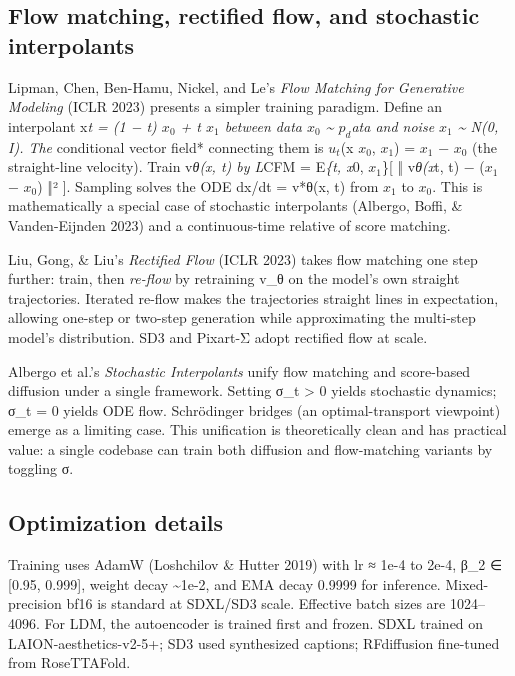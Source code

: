 \subsection{Flow matching, rectified flow, and stochastic interpolants}\label{flow-matching-rectified-flow-and-stochastic-interpolants}

Lipman, Chen, Ben-Hamu, Nickel, and Le's \emph{Flow Matching for Generative Modeling} (ICLR 2023) presents a simpler training paradigm. Define an interpolant x\emph{t = (1 − t) \(x_0\) + t \(x_1\) between data \(x_0\) \textasciitilde{} \(p_d\)ata and noise \(x_1\) \textasciitilde{} N(0, I). The }conditional vector field* connecting them is \(u_t\)(x \textbar{} \(x_0\), \(x_1\)) = \(x_1\) − \(x_0\) (the straight-line velocity). Train v\emph{θ(x, t) by L}CFM = E\emph{\{t, x}0, \(x_1\)\}{[} ‖ v\emph{θ(x}t, t) − (\(x_1\) − \(x_0\)) ‖² {]}. Sampling solves the ODE dx/dt = v*θ(x, t) from \(x_1\) to \(x_0\). This is mathematically a special case of stochastic interpolants (Albergo, Boffi, \& Vanden-Eijnden 2023) and a continuous-time relative of score matching.

Liu, Gong, \& Liu's \emph{Rectified Flow} (ICLR 2023) takes flow matching one step further: train, then \emph{re-flow} by retraining v\_θ on the model's own straight trajectories. Iterated re-flow makes the trajectories straight lines in expectation, allowing one-step or two-step generation while approximating the multi-step model's distribution. SD3 and Pixart-Σ adopt rectified flow at scale.

Albergo et al.'s \emph{Stochastic Interpolants} unify flow matching and score-based diffusion under a single framework. Setting σ\_t \textgreater{} 0 yields stochastic dynamics; σ\_t = 0 yields ODE flow. Schrödinger bridges (an optimal-transport viewpoint) emerge as a limiting case. This unification is theoretically clean and has practical value: a single codebase can train both diffusion and flow-matching variants by toggling σ.

\subsection{Optimization details}\label{optimization-details}

Training uses AdamW (Loshchilov \& Hutter 2019) with lr ≈ 1e-4 to 2e-4, β\_2 ∈ {[}0.95, 0.999{]}, weight decay \textasciitilde1e-2, and EMA decay 0.9999 for inference. Mixed-precision bf16 is standard at SDXL/SD3 scale. Effective batch sizes are 1024--4096. For LDM, the autoencoder is trained first and frozen. SDXL trained on LAION-aesthetics-v2-5+; SD3 used synthesized captions; RFdiffusion fine-tuned from RoseTTAFold.

